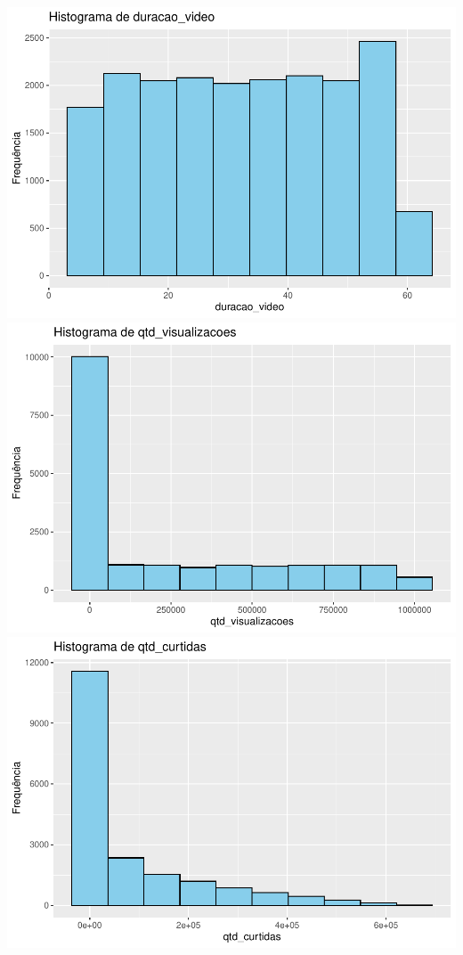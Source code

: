 \documentclass[
]{article}
\begin{document}
\includegraphics{dados_videos_files/figure-latex/histogramas_variaveis-1.pdf}
\includegraphics{dados_videos_files/figure-latex/histogramas_variaveis-2.pdf}
\includegraphics{dados_videos_files/figure-latex/histogramas_variaveis-3.pdf}
\end{document}

